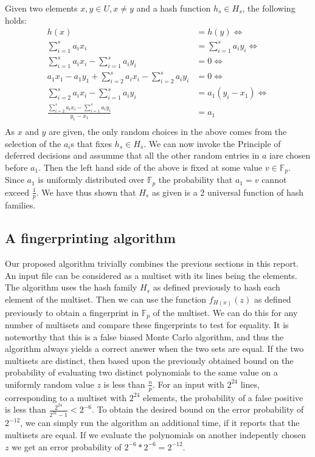 \documentclass[article,a4paper,oneside]{article}
\newcommand{\+}[1]{\ensuremath{\boldsymbol{#1}}}
\begin{document}
Given two elements $x,y \in U, x \neq y$ and a hash function $h_s \in H_s$, the following holds:
\begin{align*}
h(x) &= h(y) \iff \\
\sum_{i=1}^{s}a_ix_i &= \sum_{i=1}^sa_iy_i \iff \\
\sum_{i=1}^{s}a_ix_i - \sum_{i=1}^sa_iy_i &= 0 \iff \\
a_1x_1 - a_1y_1 + \sum_{i=2}^{s}a_ix_i - \sum_{i=2}^sa_iy_i &= 0 \iff \\
\sum_{i=2}^{s}a_ix_i - \sum_{i=1}^sa_iy_i &= a_1(y_i-x_1) \iff \\
\frac{\sum_{i=2}^{s}a_ix_i - \sum_{i=1}^sa_iy_i}{y_1-x_1} &= a_1 \\
\end{align*}
As $x$ and $y$ are given, the only random choices in the above comes from the selection of the $a_i$s that fixes $h_s \in H_s$. We can now invoke the Principle of deferred decisions and assumme that all the other random entries in $a$ iare chosen before $a_1$. Then the left hand side of the above is fixed at some value $v \in \mathbb{F}_p$. Since $a_1$ is uniformly distributed over $\mathbb{F}_p$ the probability that $a_1 = v$ cannot exceed $\frac{1}{p}$. We have thus shown that $H_s$ as given is a 2 universal function of hash families.
\subsection*{A fingerprinting algorithm}
Our proposed algorithm trivially combines the previous sections in this report.
An input file can be considered as a multiset with its lines being the elements.
The algorithm uses the hash family $H_s$ as defined previously to hash each element of the multiset. Then we can use the function $f_{H(x)}(z)$ as defined previously to obtain a fingerprint in $\mathbb{F}_p$ of the multiset.
We can do this for any number of multisets and compare these fingerprints to test for equality.
It is noteworthy that this is a false biased Monte Carlo algorithm, and thus the algorithm always yields a correct answer when the two sets are equal.
If the two multisets are distinct, then based upon the previously obtained bound on the probability of evaluating two distinct polynomials to the same value on a uniformly random value $z$ is less than $\frac{n}{p}$.
For an input with $2^{24}$ lines, corresponding to a multiset with $2^{24}$ elements, the probability of a false positive is less than $\frac{2^{24}}{2^{31}-1} < 2^{-6}$. To obtain the desired bound on the error probability of $2^{-12}$, we can simply run the algorithm an additional time, if it reports that the multisets are equal. If we evaluate the polynomials on another indepently chosen $z$ we get an error probability of $2^{-6}*2^{-6} = 2^{-12}$.
\end{document}
